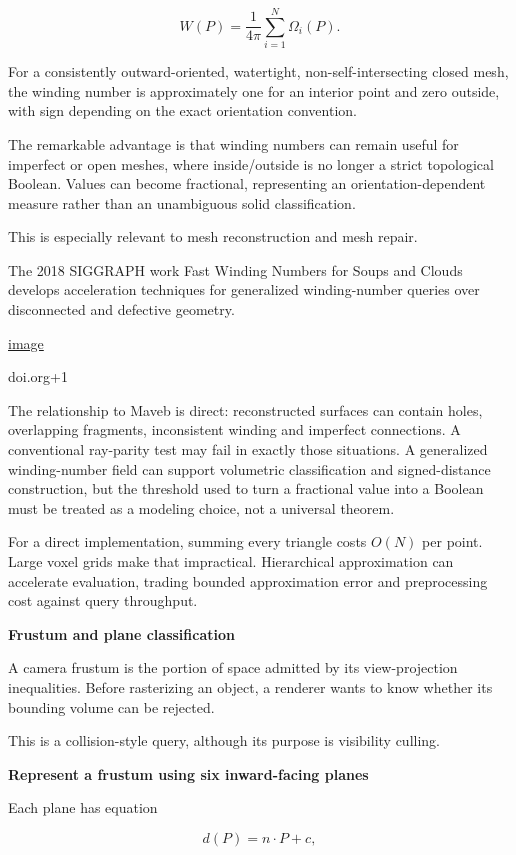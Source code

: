 \[
W(P)=\frac{1}{4\pi}\sum_{i=1}^{N}\Omega_i(P).
\]

For a consistently outward-oriented, watertight, non-self-intersecting closed mesh, the winding number is approximately one for an interior point and zero outside, with sign depending on the exact orientation convention.

The remarkable advantage is that winding numbers can remain useful for imperfect or open meshes, where inside/outside is no longer a strict topological Boolean. Values can become fractional, representing an orientation-dependent measure rather than an unambiguous solid classification.

This is especially relevant to mesh reconstruction and mesh repair.

The 2018 SIGGRAPH work Fast Winding Numbers for Soups and Clouds develops acceleration techniques for generalized winding-number queries over disconnected and defective geometry. 

\href{https://www.google.com/s2/favicons?domain=https://doi.org&sz=32}{image}

doi.org+1

The relationship to Maveb is direct: reconstructed surfaces can contain holes, overlapping fragments, inconsistent winding and imperfect connections. A conventional ray-parity test may fail in exactly those situations. A generalized winding-number field can support volumetric classification and signed-distance construction, but the threshold used to turn a fractional value into a Boolean must be treated as a modeling choice, not a universal theorem.

For a direct implementation, summing every triangle costs \(O(N)\) per point. Large voxel grids make that impractical. Hierarchical approximation can accelerate evaluation, trading bounded approximation error and preprocessing cost against query throughput.

\textbf{Frustum and plane classification}

A camera frustum is the portion of space admitted by its view-projection inequalities. Before rasterizing an object, a renderer wants to know whether its bounding volume can be rejected.

This is a collision-style query, although its purpose is visibility culling.

\textbf{Represent a frustum using six inward-facing planes}

Each plane has equation

\[
d(P)=n\cdot P+c,
\]

